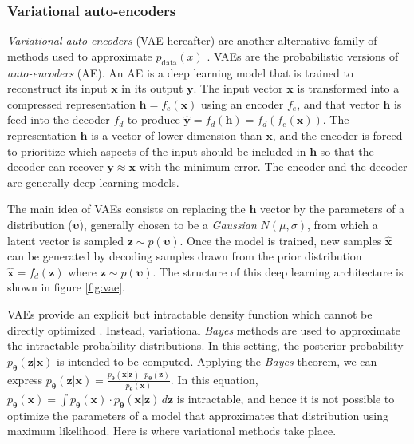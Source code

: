 \subsubsection{Variational auto-encoders}
\textit{Variational auto-encoders} (VAE hereafter) are another alternative family of methods used to approximate $p_\mathrm{data}(x)$ \autocite{kingma2019}. VAEs are the probabilistic versions of \textit{auto-encoders} (AE). An AE is a deep learning model that is trained to reconstruct its input $\mathbf{x}$ in its output $\mathbf{y}$. The input vector $\mathbf{x}$ is transformed into a compressed representation $\mathbf{h}=f_e(\mathbf{x})$ using an encoder $f_e$, and that vector $\mathbf{h}$ is feed into the decoder $f_d$ to produce $\mathbf{\hat{y}}=f_d(\mathbf{h})=f_d(f_e(\mathbf{x}))$. The representation $\mathbf{h}$ is a vector of lower dimension than $\mathbf{x}$, and the encoder is forced to prioritize which aspects of the input should be included in $\mathbf{h}$ so that the decoder can recover $\mathbf{y}\approx \mathbf{x}$ \autocite{Goodfellow2016} with the minimum error. The encoder and the decoder are generally deep learning models.

The main idea of VAEs consists on replacing the $\mathbf{h}$ vector by the parameters of a distribution ($\mathbf{\upsilon}$), generally chosen to be a \textit{Gaussian} $N(\mu,\sigma)$, from which a latent vector is sampled $\mathbf{z} \sim p(\mathbf{\upsilon})$. Once the model is trained, new samples $\mathbf{\hat{x}}$ can be generated by decoding samples drawn from the prior distribution $\mathbf{\hat{x}} = f_d(\mathbf{z})$ where $\mathbf{z} \sim p(\mathbf{\upsilon})$. The structure of this deep learning architecture is shown in figure \ref{fig:vae}.




VAEs provide an explicit but intractable density function which cannot be directly optimized \autocite{Goodfellow2016}. Instead, variational \textit{Bayes} methods are used to approximate the intractable probability distributions. In this setting, the posterior probability $p_\mathbf{\theta}(\mathbf{z}|\mathbf{x})$ is intended to be computed. Applying the \textit{Bayes} theorem, we can express $p_\mathbf{\theta}(\mathbf{z}|\mathbf{x}) = \frac{p_\mathbf{\theta}(\mathbf{x}|\mathbf{z}) \cdot p_\mathbf{\theta}(\mathbf{z})}{p_\mathbf{\theta}(\mathbf{x})}$. In this equation, $p_\mathbf{\theta}(\mathbf{x}) = \int{p_\mathbf{\theta}(\mathbf{x}) \cdot p_\mathbf{\theta}(\mathbf{x}|\mathbf{z})} \,d\mathbf{z}$ is intractable, and hence it is not possible to optimize the parameters of a model that approximates that distribution using maximum likelihood. Here is where variational methods take place. 

